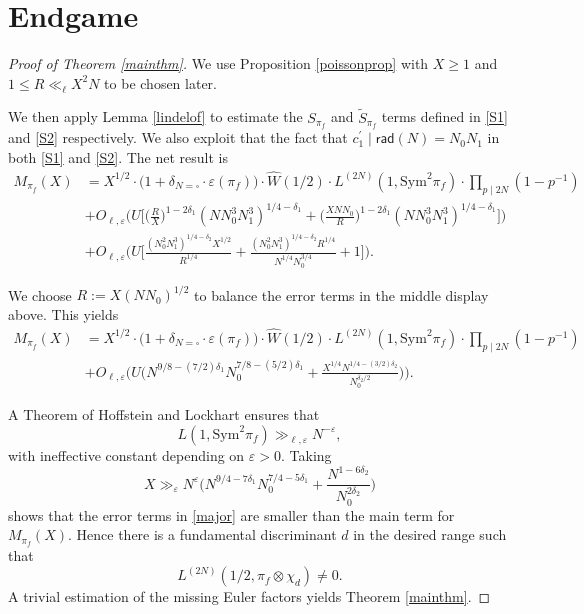 \documentclass[12pt,reqno]{amsart}
\theoremstyle{plain}
\theoremstyle{remark}
\numberwithin{equation}{section}
\numberwithin{lemma}{section}
\numberwithin{theorem}{section}
\numberwithin{prop}{section}
\numberwithin{remark}{section}
\begin{document}
\section{Endgame} \label{endgame}
\begin{proof}[Proof of Theorem \ref{mainthm}]
We use Proposition \ref{poissonprop} with $X \geq 1$
and  $1 \leq R \ll_{\ell} X^2N$ to be chosen later.

We then apply Lemma \ref{lindelof} to estimate the $S_{\pi_f}$ and 
$\widetilde{S}_{\pi_f}$ terms defined in \eqref{S1} and \eqref{S2} respectively.
We also exploit that the fact that $c_1^{\prime} \mid \mathsf{rad}(N)=N_0 N_1$
in both \eqref{S1} and \eqref{S2}.
The net result is
\begin{align} 
M_{\pi_f}(X)&=X^{1/2} \cdot \big(1+\delta_{N=\square} \cdot \varepsilon(\pi_f) \big) \cdot \widehat{W}(1/2) \cdot L^{(2N)}(1,\text{Sym}^2 \pi_f)  
\cdot \prod_{p \mid 2N} (1-p^{-1})  \nonumber \\
&+ O_{\ell,\varepsilon} \Bigg( U \bigg[  \Big(\frac{R}{X} \Big)^{1-2 \delta_1} (N N_0^3 N_1^3)^{1/4-\delta_1}
+\Big(\frac{X N N_0}{R} \Big)^{1-2 \delta_1} (N N_0^3 N_1^3)^{1/4-\delta_1} \bigg] \Bigg) \nonumber \\
&+O_{\ell,\varepsilon} 
\Bigg( U \bigg[\frac{(N_0^2 N_1^3)^{1/4-\delta_2} X^{1/2}}{R^{1/4}} 
+\frac{(N_0^2 N_1^3)^{1/4-\delta_2} R^{1/4}}{N^{1/4} N_0^{3/4}} +1 \bigg] \Bigg). \nonumber 
\end{align}

We choose $R:=X(NN_0)^{1/2}$ to balance the error 
terms in the middle display above. This yields 
\begin{align} \label{major}
M_{\pi_f}(X)&=X^{1/2} \cdot \big(1+\delta_{N=\square} \cdot \varepsilon(\pi_f) \big) \cdot \widehat{W}(1/2) \cdot L^{(2N)}(1,\text{Sym}^2 \pi_f)  
\cdot \prod_{p \mid 2N} (1-p^{-1})  \nonumber \\
&+O_{\ell,\varepsilon} \bigg( U \Big( N^{9/8-(7/2) \delta_1} N_0^{7/8-(5/2) \delta_1}
+\frac{X^{1/4} N^{1/4-(3/2) \delta_2}}{N_0^{\delta_2/2}}
 \Big)   \bigg).
\end{align}

 A Theorem of Hoffstein and Lockhart \cite[pg.~164]{HL} ensures that
\begin{equation*}
L(1,\text{Sym}^2 \pi_f) \gg_{\ell,\varepsilon} N^{-\varepsilon},
\end{equation*}
with ineffective constant depending on $\varepsilon>0$. Taking 
\begin{equation*}
X \gg_{\varepsilon} N^{\varepsilon} \Big( N^{9/4-7 \delta_1} N_0^{7/4-5 \delta_1}
+\frac{N^{1-6 \delta_2  }}{N_0^{2 \delta_2}} \Big)
\end{equation*}
shows that the error terms in \eqref{major} are smaller 
than the main term for $M_{\pi_f}(X)$.
Hence there is 
 a fundamental discriminant $d$ in the desired range such that
 \begin{equation*}
L^{(2N)}(1/2, \pi_f \otimes \chi_d) \neq 0.
\end{equation*}
A trivial estimation of the missing Euler factors 
yields Theorem \ref{mainthm}.
\end{proof}


\end{document}
